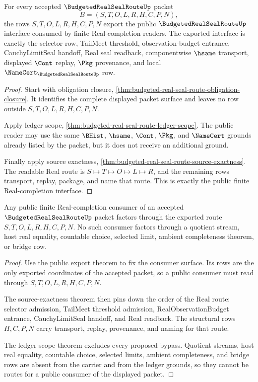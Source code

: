 \begin{theorem}
\label{thm:budgeted-real-seal-route-public-export}
For every accepted $\BudgetedRealSealRouteUp$ packet
$$
B=(S,T,O,L,R,H,C,P,N),
$$
the rows $S,T,O,L,R,H,C,P,N$ export the public
$\BudgetedRealSealRouteUp$ interface consumed by finite Real-completion
readers. The exported interface is exactly the selector row, TailMeet threshold,
observation-budget entrance, CauchyLimitSeal handoff, Real seal readback,
componentwise $\hsame$ transport, displayed $\Cont$ replay, $\Pkg$ provenance,
and local $\NameCert_{\BudgetedRealSealRouteUp}$ row.
\end{theorem}
\begin{proof}
Start with obligation closure,
\autoref{thm:budgeted-real-seal-route-obligation-closure}. It identifies the
complete displayed packet surface and leaves no row outside
$S,T,O,L,R,H,C,P,N$.

Apply ledger scope,
\autoref{thm:budgeted-real-seal-route-ledger-scope}. The public reader may use
the same $\BHist$, $\hsame$, $\Cont$, $\Pkg$, and $\NameCert$ grounds already
listed by the packet, but it does not receive an additional ground.

Finally apply source exactness,
\autoref{thm:budgeted-real-seal-route-source-exactness}. The readable Real
route is $S \longmapsto T \longmapsto O \longmapsto L \longmapsto R$, and the
remaining rows transport, replay, package, and name that route. This is exactly
the public finite Real-completion interface.
\end{proof}

\begin{theorem}
\label{thm:budgeted-real-seal-route-public-consumer-exactness}
Any public finite Real-completion consumer of an accepted
$\BudgetedRealSealRouteUp$ packet factors through the exported route
$S,T,O,L,R,H,C,P,N$. No such consumer factors through a quotient stream, host
real equality, countable choice, selected limit, ambient completeness theorem,
or bridge row.
\end{theorem}
\begin{proof}
Use the public export theorem to fix the consumer surface. Its rows are the
only exported coordinates of the accepted packet, so a public consumer must
read through $S,T,O,L,R,H,C,P,N$.

The source-exactness theorem then pins down the order of the Real route:
selector admission, TailMeet threshold admission, RealObservationBudget
entrance, CauchyLimitSeal handoff, and Real readback. The structural rows
$H,C,P,N$ carry transport, replay, provenance, and naming for that route.

The ledger-scope theorem excludes every proposed bypass. Quotient streams,
host real equality, countable choice, selected limits, ambient completeness, and
bridge rows are absent from the carrier and from the ledger grounds, so they
cannot be routes for a public consumer of the displayed packet.
\end{proof}

